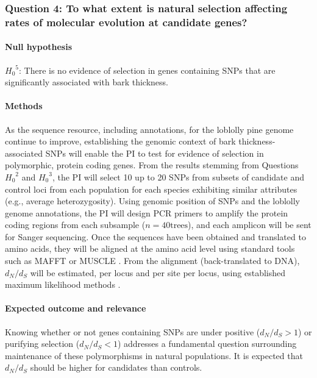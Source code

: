 \subsubsection*{Question 4: To what extent is natural selection affecting rates of molecular evolution at candidate genes?}

\paragraph{Null hypothesis} ${H_0}^5$: There is no evidence of selection in genes containing SNPs that are significantly associated 
with bark thickness.

\paragraph{Methods} As the sequence resource, including annotations, for the loblolly pine genome continue to improve, 
establishing the genomic context of bark thickness-associated SNPs will enable the PI to test for evidence of selection in 
polymorphic, protein coding genes.  From the results stemming from Questions ${H_0}^2$ and ${H_0}^3$, the PI will select 
10 up to 20 SNPs from subsets of candidate and control loci from each population for each species exhibiting similar attributes 
(e.g., average heterozygosity).   Using genomic position of SNPs and the loblolly genome annotations, the PI will design 
PCR primers to amplify the protein coding regions from each subsample ($n = 40 \text{trees}$), and each amplicon will be 
sent for Sanger sequencing.  
Once the sequences have been obtained and translated to amino acids, they will be aligned at the amino acid level using 
standard tools such as MAFFT \citep{Katoh:2005ia} or MUSCLE \citep{Edgar:2004ic}.  From the alignment (back-translated 
to DNA), $d_N/d_S$ will be estimated, per locus and per site per locus, using established maximum likelihood methods 
\citep{Yang:2007ki}.

\paragraph{Expected outcome and relevance}  Knowing whether or not genes containing SNPs are under positive ($d_N/d_S > 1$) or 
purifying selection ($d_N/d_S < 1$) addresses a fundamental question surrounding maintenance of these polymorphisms in 
natural populations.  It is expected that $d_N/d_S$ should be higher for candidates than controls.

